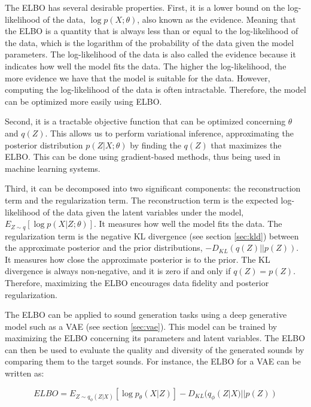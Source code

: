 The \ac{ELBO} has several desirable properties. First, it is a lower bound on the log-likelihood of the data, $\log p(X; \theta)$, also known as the evidence. Meaning that the \ac{ELBO} is a quantity that is always less than or equal to the log-likelihood of the data, which is the logarithm of the probability of the data given the model parameters. The log-likelihood of the data is also called the evidence because it indicates how well the model fits the data. The higher the log-likelihood, the more evidence we have that the model is suitable for the data. However, computing the log-likelihood of the data is often intractable. Therefore, the model can be optimized more easily using \ac{ELBO}.

Second, it is a tractable objective function that can be optimized concerning $\theta$ and $q(Z)$. This allows us to perform variational inference, approximating the posterior distribution $p(Z|X; \theta)$ by finding the $q(Z)$ that maximizes the \ac{ELBO}. This can be done using gradient-based methods, thus being used in machine learning systems.

Third, it can be decomposed into two significant components: the reconstruction term and the regularization term. The reconstruction term is the expected log-likelihood of the data given the latent variables under the model, $E_{Z \sim q}\left[\log p(X|Z; \theta)\right]$. It measures how well the model fits the data. The regularization term is the negative \ac{KL} divergence (see section \ref{sec:kld}) between the approximate posterior and the prior distributions, $-D_{KL}(q(Z)||p(Z))$. It measures how close the approximate posterior is to the prior. The \ac{KL} divergence is always non-negative, and it is zero if and only if $q(Z) = p(Z)$. Therefore, maximizing the \ac{ELBO} encourages data fidelity and posterior regularization.

The \ac{ELBO} can be applied to sound generation tasks using a deep generative model such as a \ac{VAE} (see section \ref{sec:vae}). This model can be trained by maximizing the \ac{ELBO} concerning its parameters and latent variables. The \ac{ELBO} can then be used to evaluate the quality and diversity of the generated sounds by comparing them to the target sounds. For instance, the \ac{ELBO} for a \ac{VAE} can be written as:

\begin{equation}
ELBO = E_{Z \sim q_\phi(Z|X)}\left[\log p_\theta(X|Z)\right] - D_{KL}(q_\phi(Z|X)||p(Z))
\end{equation}

